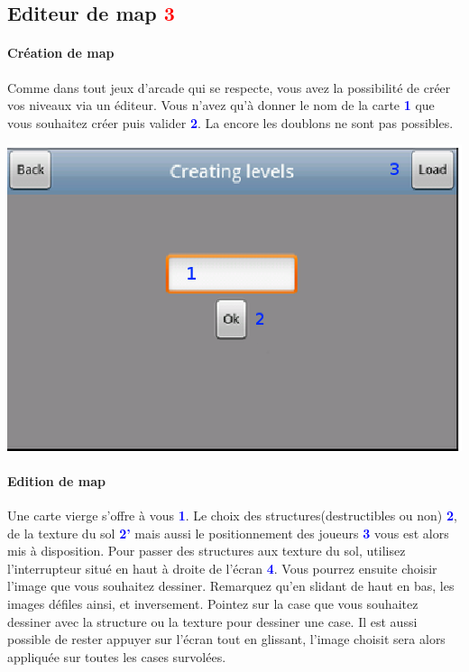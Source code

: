 	
\subsection{Editeur de map \textcolor{red}{3} }
	
	\paragraph{Création de map\\}
	Comme dans tout jeux d'arcade qui se respecte, vous avez la possibilité de
	créer vos niveaux via un éditeur. Vous n'avez qu'à donner le nom de la carte
	\textcolor{blue}{\textbf{1}}	que vous souhaitez créer puis valider
	\textcolor{blue}{\textbf{2}}. La encore les doublons ne sont pas possibles.
	
	\begin{center}
			\includegraphics[scale=0.6]{Manuel/Img/10.eps}
	\end{center}

	
	\paragraph{Edition de map\\}
	Une carte vierge s'offre à vous \textcolor{blue}{\textbf{1}}. Le choix des
	structures(destructibles ou non) \textcolor{blue}{\textbf{2}}, de la texture du
	sol \textcolor{blue}{\textbf{2'}} mais aussi le positionnement des joueurs
	\textcolor{blue}{\textbf{3}} vous est alors mis à disposition. Pour passer des
	structures aux texture du sol, utilisez l'interrupteur situé en haut à droite
	de l'écran \textcolor{blue}{\textbf{4}}. Vous pourrez ensuite choisir l'image
	que vous souhaitez dessiner. Remarquez qu'en slidant de haut en bas, les images défiles ainsi, et inversement. Pointez
	sur la case que vous souhaitez dessiner avec la structure ou la texture pour
	dessiner une case. Il est aussi possible de rester appuyer sur l'écran tout en
	glissant, l'image choisit sera alors appliquée sur toutes les cases survolées.
	
